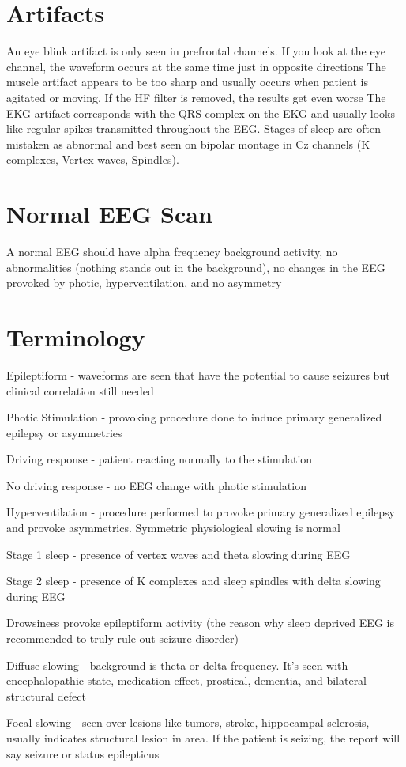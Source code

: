 \documentclass[12pt]{article}
\begin{document}
\section{Artifacts}
An eye blink artifact is only seen in prefrontal channels. If you look at the eye channel, the waveform occurs at the same time just in opposite directions
\medskip
The muscle artifact appears to be too sharp and usually occurs when patient is agitated or moving. If the HF filter is removed, the results get even worse
\medskip
The EKG artifact corresponds with the QRS complex on the EKG and usually looks like regular spikes transmitted throughout the EEG.
\medskip
Stages of sleep are often mistaken as abnormal and best seen on bipolar montage in Cz channels (K complexes, Vertex waves, Spindles).

\section{Normal EEG Scan}
A normal EEG should have alpha frequency background activity, no abnormalities (nothing stands out in the background), no changes in the EEG provoked by photic, hyperventilation, and no asymmetry  

\section{Terminology} 
	Epileptiform - waveforms are seen that have the potential to cause seizures but clinical correlation still needed
\medskip

	Photic Stimulation - provoking procedure done to induce primary generalized epilepsy or asymmetries 
\medskip

	Driving response - patient reacting normally to the stimulation 
\medskip

	No driving response - no EEG change with photic stimulation 
\medskip

	Hyperventilation - procedure performed to provoke primary generalized epilepsy and provoke asymmetrics. Symmetric physiological slowing is normal 
\medskip

	Stage 1 sleep - presence of vertex waves and theta slowing during EEG
\medskip

	Stage 2 sleep - presence of K complexes and sleep spindles with delta slowing during EEG
\medskip

	Drowsiness provoke epileptiform activity (the reason why sleep deprived EEG is recommended to truly rule out seizure disorder)
\medskip

	Diffuse slowing - background is theta or delta frequency. It’s seen with encephalopathic state, medication effect, prostical, dementia, and bilateral structural defect
\medskip

	Focal slowing - seen over lesions like tumors, stroke, hippocampal sclerosis, usually indicates structural lesion in area. If the patient is seizing, the report will say seizure or status epilepticus 
\end{document}
